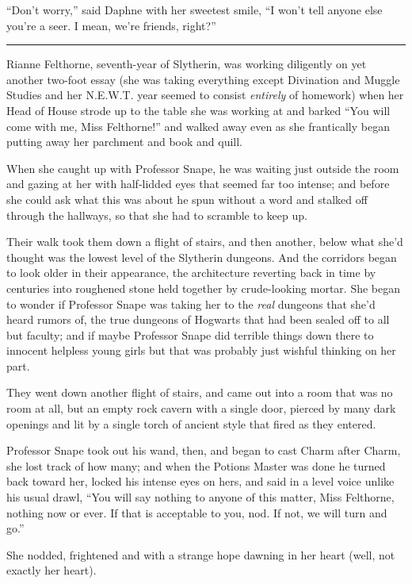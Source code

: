 ``Don't worry,'' said Daphne with her sweetest smile, ``I won't tell
anyone else you're a seer. I mean, we're friends, right?''

\begin{center}\rule{3in}{0.4pt}\end{center}

Rianne Felthorne, seventh-year of Slytherin, was working diligently on
yet another two-foot essay (she was taking everything except Divination
and Muggle Studies and her N.E.W.T. year seemed to consist
\emph{entirely} of homework) when her Head of House strode up to the
table she was working at and barked ``You will come with me, Miss
Felthorne!'' and walked away even as she frantically began putting away
her parchment and book and quill.

When she caught up with Professor Snape, he was waiting just outside the
room and gazing at her with half-lidded eyes that seemed far too
intense; and before she could ask what this was about he spun without a
word and stalked off through the hallways, so that she had to scramble
to keep up.

Their walk took them down a flight of stairs, and then another, below
what she'd thought was the lowest level of the Slytherin dungeons. And
the corridors began to look older in their appearance, the architecture
reverting back in time by centuries into roughened stone held together
by crude-looking mortar. She began to wonder if Professor Snape was
taking her to the \emph{real} dungeons that she'd heard rumors of, the
true dungeons of Hogwarts that had been sealed off to all but faculty;
and if maybe Professor Snape did terrible things down there to innocent
helpless young girls but that was probably just wishful thinking on her
part.

They went down another flight of stairs, and came out into a room that
was no room at all, but an empty rock cavern with a single door, pierced
by many dark openings and lit by a single torch of ancient style that
fired as they entered.

Professor Snape took out his wand, then, and began to cast Charm after
Charm, she lost track of how many; and when the Potions Master was done
he turned back toward her, locked his intense eyes on hers, and said in
a level voice unlike his usual drawl, ``You will say nothing to anyone
of this matter, Miss Felthorne, nothing now or ever. If that is
acceptable to you, nod. If not, we will turn and go.''

She nodded, frightened and with a strange hope dawning in her heart
(well, not exactly her heart).

